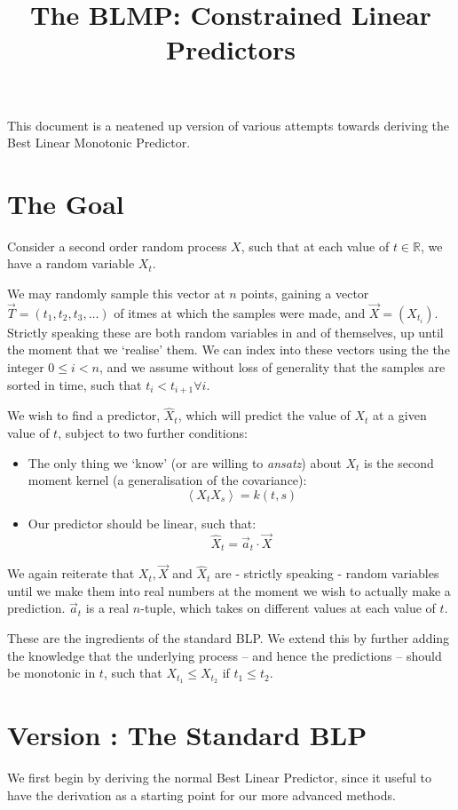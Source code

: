 \documentclass{article}
\title{The BLMP: Constrained Linear Predictors}
\def\llangle{\left\langle}
\def\rrangle{\right\rangle}
\newcommand\E[1]{\llangle #1 \rrangle}
\newcounter{version}
\newcommand\attempt[1]{\stepcounter{version} \section*{Version \theversion: #1}}
\begin{document}
	\maketitle

	This document is a neatened up version of various attempts towards deriving the Best Linear Monotonic Predictor. 

	\section*{The Goal}
		Consider a second order random process $X$, such that at each value of $t \in \mathbb{R}$, we have a random variable $X_t$. 

		We may randomly sample this vector at $n$ points, gaining a vector $\vec{T} = (t_1,t_2,t_3,\hdots)$ of itmes at which the samples were made, and $\vec{X} = (X_{t_i})$. Strictly speaking these are both random variables in and of themselves, up until the moment that we `realise' them. We can index into these vectors using the the integer $0 \leq i < n$, and we assume without loss of generality that the samples are sorted in time, such that $t_i < t_{i+1} \forall i$.

		We wish to find a predictor, $\hat{X}_t$, which will predict the value of $X_t$ at a given value of $t$, subject to two further conditions:
		\begin{itemize}
			\item The only thing we `know' (or are willing to \textit{ansatz}) about $X_t$ is the second moment kernel (a generalisation of the covariance):
			$$ \E{X_t X_s} = k(t,s)$$
			\item Our predictor should be linear, such that:
			$$\hat{X}_t = \vec{a}_t \cdot \vec{X}$$
		\end{itemize}
		We again reiterate that $X_t, \vec{X}$ and $\hat{X}_t$ are - strictly speaking - random variables until we make them into real numbers at the moment we wish to actually make a prediction. $\vec{a}_t$ is a real $n$-tuple, which takes on different values at each value of $t$.

		These are the ingredients of the standard BLP. We extend this by further adding the knowledge that the underlying process -- and hence the predictions -- should be monotonic in $t$, such that $X_{t_1} \leq  X_{t_2}$ if $t_1 \leq t_2$.
	\attempt{The Standard BLP}

		We first begin by deriving the normal Best Linear Predictor, since it useful to have the derivation as a starting point for our more advanced methods. 
\end{document}

